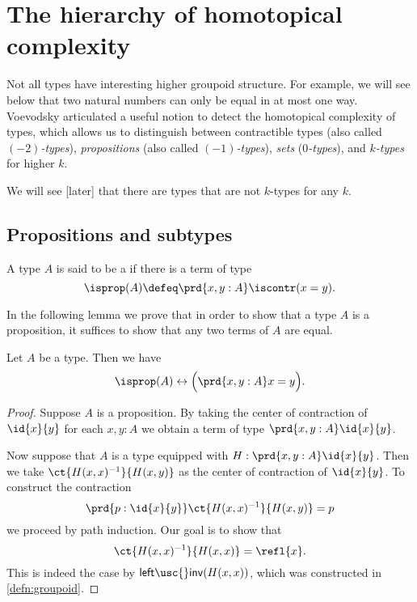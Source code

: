 \chapter{The hierarchy of homotopical complexity}
Not all types have interesting higher groupoid structure. For example, we will see below that two natural numbers can only be equal in at most one way. Voevodsky articulated a useful notion to detect the homotopical complexity of types, which allows us to distinguish between contractible types (also called \emph{$(-2)$-types}), \emph{propositions} (also called \emph{$(-1)$-types}), \emph{sets} (\emph{$0$-types}), and \emph{$k$-types} for higher $k$.

We will see [later] that there are types that are not $k$-types for any $k$.

\section{Propositions and subtypes}

\begin{defn}
A type $A$ is said to be a  if there is a term of type
\begin{equation*}
\isprop(A)\defeq\prd{x,y:A}\iscontr(x=y).
\end{equation*}
\end{defn}

In the following lemma we prove that in order to show that a type $A$ is a proposition, it suffices to show that any two terms of $A$ are equal.

\begin{lem}\label{lem:isprop_eq}
Let $A$ be a type. Then we have
\begin{equation*}
\isprop(A)\leftrightarrow \Big(\prd{x,y:A}x=y\Big).
\end{equation*}
\end{lem}

\begin{proof}
Suppose $A$ is a proposition. By taking the center of contraction of $\id{x}{y}$ for each $x,y:A$ we obtain a term of type $\prd{x,y:A}\id{x}{y}$.

Now suppose that $A$ is a type equipped with $H:\prd{x,y:A}\id{x}{y}$. Then we take $\ct{H(x,x)^{-1}}{H(x,y)}$ as the center of contraction of $\id{x}{y}$. To construct the contraction
\begin{equation*}
\prd{p:\id{x}{y}} \ct{H(x,x)^{-1}}{H(x,y)}=p
\end{equation*}
we proceed by path induction. Our goal is to show that
\begin{equation*}
\ct{H(x,x)^{-1}}{H(x,x)}=\refl{x}.
\end{equation*}
This is indeed the case by $\mathsf{left\usc{}inv}(H(x,x))$, which was constructed in \autoref{defn:groupoid}.
\end{proof}

